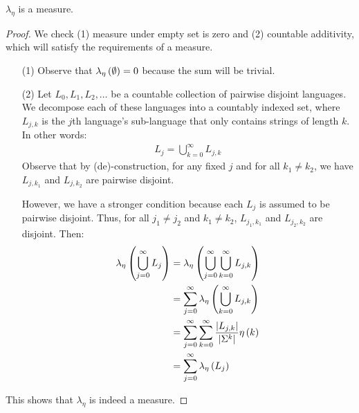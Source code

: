 \documentclass[12pt]{article}
\begin{document}
\begin{theorem}
  \(\lambda_{\eta}\) is a measure.
\end{theorem}
\begin{proof}
  We check (1) measure under empty set is zero and (2) countable additivity,
  which will satisfy the requirements of a measure.
  \begin{enumerate}
    \item[(1)]
      Observe that \(\lambda_{\eta} \left(\emptyset\right) = 0\) because the sum
      will be trivial.

    \item[(2)]
      Let \(L_0, L_1, L_2, \ldots\) be a countable collection of pairwise
      disjoint languages.
      We decompose each of these languages into a countably indexed set,
      where \(L_{j, k}\) is the \(j\)th language's sub-language
      that only contains strings of length \(k\).
      In other words:
      \begin{align*}
        L_j = \bigcup_{k = 0}^{\infty} L_{j, k}
      \end{align*}
      Observe that by (de)-construction, for any fixed \(j\) and for all
      \(k_1 \neq k_2\), we have \(L_{j, k_1}\) and \(L_{j, k_2}\) are
      pairwise disjoint.

      However, we have a stronger condition because each \(L_j\) is
      assumed to be pairwise disjoint.
      Thus, for all \(j_1 \neq j_2\) and \(k_1 \neq k_2\),
      \(L_{j_1, k_1}\) and \(L_{j_2, k_2}\) are disjoint.
      Then:
      \begin{align*}
        \lambda_{\eta} \left(\bigcup_{j = 0}^{\infty} L_j\right)
          &= \lambda_{\eta} \left(\bigcup_{j = 0}^{\infty}
                            \bigcup_{k = 0}^{\infty} L_{j, k}\right) \\
          &= \sum_{j = 0}^{\infty}
              \lambda_{\eta} \left(\bigcup_{k = 0}^{\infty} L_{j, k}\right) \\
          &= \sum_{j = 0}^{\infty}
              \sum_{k = 0}^{\infty}
              \frac{\left\lvert L_{j, k}\right\rvert}{\left\lvert\Sigma^k\right\rvert}
                \eta\left(k\right) \\
          &= \sum_{j = 0}^{\infty} \lambda_{\eta} \left(L_j\right)
      \end{align*}
  \end{enumerate}
  This shows that \(\lambda_{\eta} \) is indeed a measure.
\end{proof}


\end{document}
